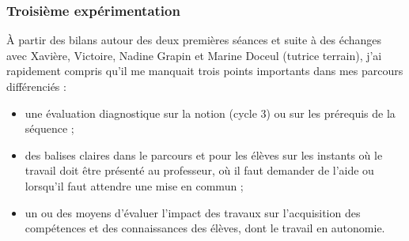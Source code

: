 \subsubsection*{Troisième expérimentation}
À partir des bilans autour des deux premières séances et suite à des échanges avec Xavière, Victoire, Nadine Grapin et Marine Doceul (tutrice terrain), j'ai rapidement compris qu'il me manquait trois points importants dans mes parcours différenciés :
\begin{itemize}
	\item une évaluation diagnostique sur la notion (cycle 3) ou sur les prérequis de la séquence ;
	\item des balises claires dans le parcours et pour les élèves sur les instants où le travail doit être présenté au professeur, où il faut demander de l'aide ou lorsqu'il faut attendre une mise en commun ;
	\item un ou des moyens d'évaluer l'impact des travaux sur l'acquisition des compétences et des connaissances des élèves, dont le travail en autonomie.
\end{itemize}
